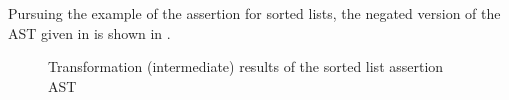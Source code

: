 Pursuing the example of the assertion for sorted lists, the negated version of the AST given in  is shown in .
\begin{figure}
\hfill
{}
\caption{Transformation (intermediate) results of the sorted list assertion AST}
\end{figure}

